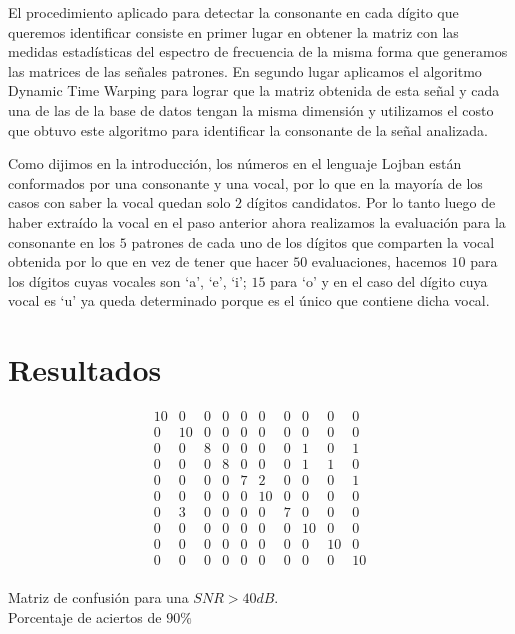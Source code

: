 \documentclass[conference,a4paper,10pt,oneside,final]{tfmpd}
\begin{document}
		El procedimiento aplicado para detectar la consonante en cada dígito que
		queremos identificar consiste en primer lugar en obtener la matriz con
		las medidas estadísticas del espectro de frecuencia de la misma forma
		que generamos las matrices de las señales patrones. En segundo lugar
		aplicamos el algoritmo Dynamic Time Warping  para lograr que la matriz
		obtenida de esta señal y cada una de las de la base de datos tengan la
		misma dimensión  y utilizamos el costo que obtuvo este algoritmo para
		identificar la consonante de la señal analizada.

		Como dijimos en la introducción, los números en el lenguaje Lojban
		están conformados por una consonante y una vocal, por lo que en
		la mayoría de los casos con saber la vocal quedan solo $2$ dígitos
		candidatos. Por lo tanto luego de haber extraído la vocal en el paso
		anterior ahora realizamos la evaluación para la consonante en los $5$
		patrones de cada uno de los dígitos que comparten la vocal obtenida por
		lo que en vez de tener que hacer $50$ evaluaciones, hacemos $10$ para los
		dígitos cuyas vocales son `a', `e', `i'; $15$ para `o' y en el caso del dígito
		cuya vocal es `u' ya queda determinado porque es el único que contiene
		dicha vocal.


\section{Resultados}
	\begin{table}
	\[
		\begin{array}{cccccccccc}
10 & 0 & 0 & 0 & 0 & 0 & 0 & 0 & 0 & 0 \\
0 & 10 & 0 & 0 & 0 & 0 & 0 & 0 & 0 & 0 \\
0 & 0 & 8 & 0 & 0 & 0 & 0 & 1 & 0 & 1 \\
0 & 0 & 0 & 8 & 0 & 0 & 0 & 1 & 1 & 0 \\
0 & 0 & 0 & 0 & 7 & 2 & 0 & 0 & 0 & 1 \\
0 & 0 & 0 & 0 & 0 & 10 & 0 & 0 & 0 & 0 \\
0 & 3 & 0 & 0 & 0 & 0 & 7 & 0 & 0 & 0 \\
0 & 0 & 0 & 0 & 0 & 0 & 0 & 10 & 0 & 0 \\
0 & 0 & 0 & 0 & 0 & 0 & 0 & 0 & 10 & 0 \\
0 & 0 & 0 & 0 & 0 & 0 & 0 & 0 & 0 & 10 \\
		\end{array}
	\]
		\caption{Matriz de confusión para una $SNR > 40dB$.\\
		Porcentaje de aciertos de $90\%$}
	\end{table}
\end{document}
